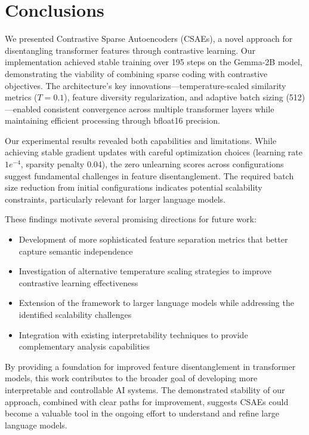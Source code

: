 \documentclass{article} %
\begin{document}
\section{Conclusions}
\label{sec:conclusions}

We presented Contrastive Sparse Autoencoders (CSAEs), a novel approach for disentangling transformer features through contrastive learning. Our implementation achieved stable training over 195 steps on the Gemma-2B model, demonstrating the viability of combining sparse coding with contrastive objectives. The architecture's key innovations—temperature-scaled similarity metrics ($T=0.1$), feature diversity regularization, and adaptive batch sizing (512)—enabled consistent convergence across multiple transformer layers while maintaining efficient processing through bfloat16 precision.

Our experimental results revealed both capabilities and limitations. While achieving stable gradient updates with careful optimization choices (learning rate $1e^{-4}$, sparsity penalty 0.04), the zero unlearning scores across configurations suggest fundamental challenges in feature disentanglement. The required batch size reduction from initial configurations indicates potential scalability constraints, particularly relevant for larger language models.

These findings motivate several promising directions for future work:

\begin{itemize}
    \item Development of more sophisticated feature separation metrics that better capture semantic independence
    \item Investigation of alternative temperature scaling strategies to improve contrastive learning effectiveness
    \item Extension of the framework to larger language models while addressing the identified scalability challenges
    \item Integration with existing interpretability techniques to provide complementary analysis capabilities
\end{itemize}

By providing a foundation for improved feature disentanglement in transformer models, this work contributes to the broader goal of developing more interpretable and controllable AI systems. The demonstrated stability of our approach, combined with clear paths for improvement, suggests CSAEs could become a valuable tool in the ongoing effort to understand and refine large language models.



\end{document}

